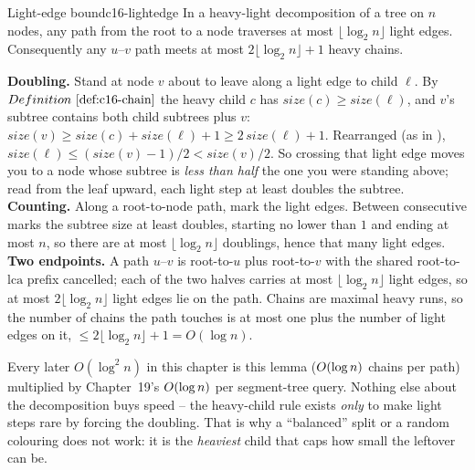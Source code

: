 \begin{theorem}{Light-edge bound}{c16-lightedge}
In a heavy-light decomposition of a tree on \(n\) nodes, any path from the root to a node traverses at most \(\lfloor\log_2 n\rfloor\) light edges.  Consequently any \(u\)--\(v\) path meets at most \(2\lfloor\log_2 n\rfloor+1\) heavy chains.
\end{theorem}
\begin{proofbox}
\textbf{Doubling.} Stand at node \(v\) about to leave along a light edge to child \(\ell\).  By \(\defref{c16-chain}\) the heavy child \(c\) has \(\mathit{size}(c)\ge\mathit{size}(\ell)\), and \(v\)'s subtree contains both child subtrees plus \(v\): \(\mathit{size}(v)\ge \mathit{size}(c)+\mathit{size}(\ell)+1\ge 2\,\mathit{size}(\ell)+1\).  Rearranged (as in ), \(\mathit{size}(\ell)\le(\mathit{size}(v)-1)/2<\mathit{size}(v)/2\).  So crossing that light edge moves you to a node whose subtree is \emph{less than half} the one you were standing above; read from the leaf upward, each light step at least doubles the subtree.\\
\textbf{Counting.} Along a root-to-node path, mark the light edges. Between consecutive marks the subtree size at least doubles, starting no lower than \(1\) and ending at most \(n\), so there are at most \(\lfloor\log_2 n\rfloor\) doublings, hence that many light edges.\\
\textbf{Two endpoints.} A path \(u\)--\(v\) is root-to-\(u\) plus root-to-\(v\) with the shared root-to-\(\mathrm{lca}\) prefix cancelled; each of the two halves carries at most \(\lfloor\log_2 n\rfloor\) light edges, so at most \(2\lfloor\log_2 n\rfloor\) light edges lie on the path.  Chains are maximal heavy runs, so the number of chains the path touches is at most one plus the number of light edges on it, \(\le 2\lfloor\log_2 n\rfloor+1=O(\log n)\).
\end{proofbox}

\begin{insightbox}
Every later \(O(\log^2 n)\) in this chapter is this lemma (\(O(\log n)\) chains per path) multiplied by Chapter~19's \(O(\log n)\) per segment-tree query.  Nothing else about the decomposition buys speed -- the heavy-child rule exists \emph{only} to make light steps rare by forcing the doubling.  That is why a ``balanced'' split or a random colouring does not work: it is the \emph{heaviest} child that caps how small the leftover can be.
\end{insightbox}

